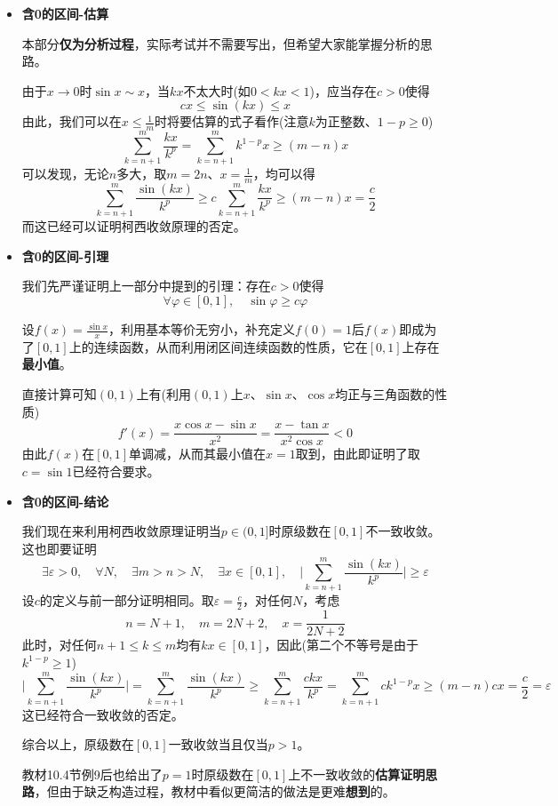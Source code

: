 \documentclass[a4paper,UTF8,fontset=windows,AutoFakeBold]{ctexart}
\newcommand*{\note}{\noindent *}
\theoremstyle{ex}
\begin{document}
\begin{framed}
{\begin{itemize}
        \item \textbf{含0的区间-估算}
        
        \note 本部分\textbf{仅为分析过程}，实际考试并不需要写出，但希望大家能掌握分析的思路。

        由于$x\to0$时$\sin x\sim x$，当$kx$不太大时(如$0<kx<1$)，应当存在$c>0$使得
        $$cx\le\sin(kx)\le x$$
        由此，我们可以在$x\le\frac{1}{m}$时将要估算的式子看作(注意$k$为正整数、$1-p\ge0$)
        $$\sum_{k=n+1}^m\frac{kx}{k^p}=\sum_{k=n+1}^mk^{1-p}x\ge(m-n)x$$
        可以发现，无论$n$多大，取$m=2n$、$x=\frac{1}{m}$，均可以得
        $$\sum_{k=n+1}^m\frac{\sin(kx)}{k^p}\ge c\sum_{k=n+1}^m\frac{kx}{k^p}\ge(m-n)x=\frac{c}{2}$$
        而这已经可以证明柯西收敛原理的否定。

        \item \textbf{含0的区间-引理}
        
        我们先严谨证明上一部分中提到的引理：存在$c>0$使得
        $$\forall\varphi\in[0,1],\quad\sin\varphi\ge c\varphi$$

        设$f(x)=\frac{\sin x}{x}$，利用基本等价无穷小，补充定义$f(0)=1$后$f(x)$即成为了$[0,1]$上的连续函数，从而利用闭区间连续函数的性质，它在$[0,1]$上存在\textbf{最小值}。

        直接计算可知$(0,1)$上有(利用$(0,1)$上$x$、$\sin x$、$\cos x$均正与三角函数的性质)
        $$f'(x)=\frac{x\cos x-\sin x}{x^2}=\frac{x-\tan x}{x^2\cos x}<0$$
        由此$f(x)$在$[0,1]$单调减，从而其最小值在$x=1$取到，由此即证明了取$c=\sin1$已经符合要求。

        \item \textbf{含0的区间-结论}
        
        我们现在来利用柯西收敛原理证明当$p\in(0,1]$时原级数在$[0,1]$不一致收敛。这也即要证明
        $$\exists\varepsilon>0,\quad\forall N,\quad\exists m>n>N,\quad\exists x\in[0,1],\quad\bigg|\sum_{k=n+1}^m\frac{\sin(kx)}{k^p}\bigg|\ge\varepsilon$$
        设$c$的定义与前一部分证明相同。取$\varepsilon=\frac{c}{2}$，对任何$N$，考虑
        $$n=N+1,\quad m=2N+2,\quad x=\frac{1}{2N+2}$$
        此时，对任何$n+1\le k\le m$均有$kx\in[0,1]$，因此(第二个不等号是由于$k^{1-p}\ge1$)
        $$\bigg|\sum_{k=n+1}^m\frac{\sin(kx)}{k^p}\bigg|=\sum_{k=n+1}^m\frac{\sin(kx)}{k^p}\ge\sum_{k=n+1}^m\frac{ckx}{k^p}=\sum_{k=n+1}^mck^{1-p}x\ge(m-n)cx=\frac{c}{2}=\varepsilon$$
        这已经符合一致收敛的否定。

        综合以上，原级数在$[0,1]$一致收敛当且仅当$p>1$。

        \note 教材10.4节例9后也给出了$p=1$时原级数在$[0,1]$上不一致收敛的\textbf{估算证明思路}，但由于缺乏构造过程，教材中看似更简洁的做法是更难\textbf{想到}的。
    \end{itemize}
}
\end{framed}
\end{document}
